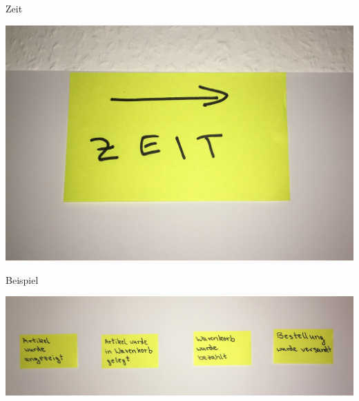 \begin{frame}[fragile]{Zeit}

\begin{center}
\includegraphics[width=.5\textwidth]{pics/eventstorming_zeit.jpg}
\end{center}

\end{frame}


\begin{frame}[fragile]{Beispiel}

\begin{center}
\includegraphics[width=.9\textwidth]{pics/eventstorming_zeitlich_geordnet.jpg}
\end{center}

\end{frame}

